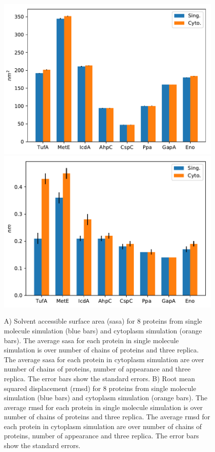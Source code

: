 \documentclass[journal=jacsat,manuscript=article]{achemso}
\begin{document}
\begin{figure}[H]
\includegraphics[scale=0.5]{sasa.pdf}
\includegraphics[scale=0.5]{rmsd.pdf}

\caption{A) Solvent accessible surface area (sasa) for 8 proteins from single molecule simulation (blue bars) and cytoplasm simulation (orange bars). The average sasa for each protein in single molecule simulation is over number of chains of proteins and three replica. The average sasa for each protein in cytoplasm simulation are over number of chains of proteins, number of appearance and three replica. The error bars show the standard errors. B) Root mean squared displacement (rmsd) for 8 proteins from single molecule simulation (blue bars) and cytoplasm simulation (orange bars). The average rmsd for each protein in single molecule simulation is over number of chains of proteins and three replica. The average rmsd for each protein in cytoplasm simulation are over number of chains of proteins, number of appearance and three replica. The error bars show the standard errors.\textbf{\color{red}{THE MEASUREMENT NAME, SASA AND RMSD, IS MISSING IN THE Y-AXIS OF BOTH PLOTS}}}
\label{fig:structural_integrity_chain}
\end{figure}
\end{document}
